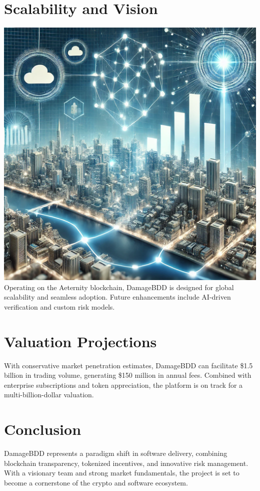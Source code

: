 \documentclass[12pt,a4paper]{article}
\begin{document}
\section{Scalability and Vision}
\includegraphics[width=\textwidth]{compressed/scalability.png} %
Operating on the Aeternity blockchain, DamageBDD is designed for global scalability and seamless adoption. Future enhancements include AI-driven verification and custom risk models.

\section{Valuation Projections}
With conservative market penetration estimates, DamageBDD can facilitate \$1.5 billion in trading volume, generating \$150 million in annual fees. Combined with enterprise subscriptions and token appreciation, the platform is on track for a multi-billion-dollar valuation.

\section{Conclusion}
DamageBDD represents a paradigm shift in software delivery, combining blockchain transparency, tokenized incentives, and innovative risk management. With a visionary team and strong market fundamentals, the project is set to become a cornerstone of the crypto and software ecosystem.
\end{document}
